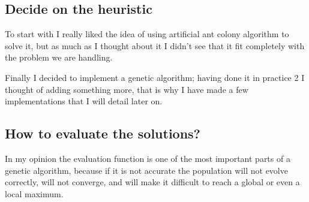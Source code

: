 \documentclass{article}
\begin{document}
    \subsection{Decide on the heuristic}

    To start with I really liked the idea of using artificial ant colony algorithm to solve it, 
    but as much as I thought about it I didn't see that it fit completely with the problem we are handling.

    Finally I decided to implement a genetic algorithm; having done it in practice 2 I thought of adding 
    something more, that is why I have made a few implementations that I will detail later on.

    \subsection{How to evaluate the solutions?}

    In my opinion the evaluation function is one of the most important parts of a genetic algorithm, 
    because if it is not accurate the population will not evolve correctly, will not converge, and 
    will make it difficult to reach a global or even a local maximum.
\end{document}

